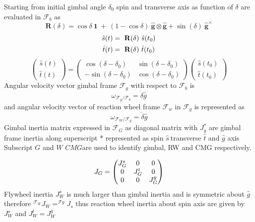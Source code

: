 Starting from initial gimbal angle $\displaystyle \delta_{0}$ spin and transverse axis as function of $\displaystyle \delta $ are evaluated in $\displaystyle \mathcal{F}_{b}$ as
\begin{equation}
\mathbf{R}( \delta ) =\cos \delta \ \mathbf{1} \ +\ ( 1-\cos \delta ) \ \hat{\mathbf{g}} \otimes \hat{\mathbf{g}} +\sin( \delta ) \ \hat{\mathbf{g}}^{\times }
\end{equation}
\begin{gather}
\hat{s}( t) =\ \mathbf{R}( \delta ) \ \hat{s}( t_{0})\\
\hat{t}( t) =\ \mathbf{R}( \delta ) \ \hat{t}( t_{0}) \notag
\end{gather}
\begin{equation}
\begin{pmatrix}
\hat{s}( t)\\
\hat{t}( t)
\end{pmatrix} =\begin{pmatrix}
\cos( \delta -\delta_{0}) & \sin( \delta -\delta_{0})\\
-\sin( \delta -\delta_{0}) & \cos( \delta -\delta_{0})
\end{pmatrix}\begin{pmatrix}
\hat{s}( t_{0})\\
\hat{t}( t_{0})
\end{pmatrix}
\end{equation}
Angular velocity vector gimbal frame $\displaystyle \mathcal{F}_{g}$ with respect to $\displaystyle \mathcal{F}_{b}$ is 
\begin{equation}
\omega _{\mathcal{F}_{g} /\mathcal{F}_{b}} =\dot{\delta}\hat{g}
\end{equation}
and angular velocity vector of reaction wheel frame $\displaystyle \mathcal{F}_{w}$ in $\displaystyle \mathcal{F}_{g}$ is represented as
\begin{equation}
\omega _{\mathcal{F}_{W} /\mathcal{F}_{g}} =\dot{\delta}\hat{g}
\end{equation}
Gimbal inertia matrix expressed in $\displaystyle \mathcal{F}_{G}$ as diagonal matrix with $\displaystyle J^{*}_{g}$ are gimbal frame inertia along superscript * represented as spin $\displaystyle \hat{s} \ $transverse $\displaystyle \hat{t}$ and $\displaystyle \hat{g}$ axis Subscript $G$ and $W$  $CMG$are used to identify gimbal, RW and CMG respectively.


\begin{gather}
J_{G} =\begin{pmatrix}
J^{s}_{G} & 0 & 0\\
0 & J^{t}_{G} & 0\\
0 & 0 & J^{g}_{G}
\end{pmatrix} \notag
\end{gather}
Flywheel inertia $\displaystyle J^s_{W}$ is much larger than gimbal inertia and is symmetric about $\displaystyle \hat{g}$ therefore $\displaystyle ^{\mathcal{F}_{W}} J_{W} =^{\mathcal{F} g} J_{s}$ thus reaction wheel inertia about spin axis are given by $\displaystyle J^{s}_{W}$ and $\displaystyle J^{t}_{W} =J^{g}_{W}$

